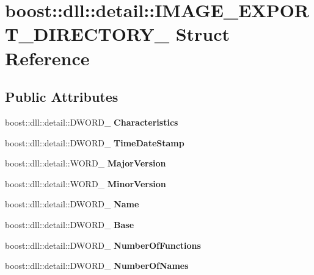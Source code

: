 \hypertarget{a01596}{}\section{boost\+:\+:dll\+:\+:detail\+:\+:I\+M\+A\+G\+E\+\_\+\+E\+X\+P\+O\+R\+T\+\_\+\+D\+I\+R\+E\+C\+T\+O\+R\+Y\+\_\+ Struct Reference}
\label{a01596}
\subsection*{Public Attributes}
\begin{DoxyCompactItemize}
\item 
\mbox{\label{a01596_a9e38ab93cca0b67f8e2442732422e6d2}} 
boost\+::dll\+::detail\+::\+D\+W\+O\+R\+D\+\_\+ {\bfseries Characteristics}
\item 
\mbox{\label{a01596_a739de9030de675c85bfeb2a5d3d5be67}} 
boost\+::dll\+::detail\+::\+D\+W\+O\+R\+D\+\_\+ {\bfseries Time\+Date\+Stamp}
\item 
\mbox{\label{a01596_a039cfd06d5bb240d9f61dc92eb41f53e}} 
boost\+::dll\+::detail\+::\+W\+O\+R\+D\+\_\+ {\bfseries Major\+Version}
\item 
\mbox{\label{a01596_a9bba569a6e4fc6ee2f92594cb8b6487f}} 
boost\+::dll\+::detail\+::\+W\+O\+R\+D\+\_\+ {\bfseries Minor\+Version}
\item 
\mbox{\label{a01596_ab8e041ceece18fa6e0589eb33d480629}} 
boost\+::dll\+::detail\+::\+D\+W\+O\+R\+D\+\_\+ {\bfseries Name}
\item 
\mbox{\label{a01596_aec005afc52afc2fab10a60f219a35afc}} 
boost\+::dll\+::detail\+::\+D\+W\+O\+R\+D\+\_\+ {\bfseries Base}
\item 
\mbox{\label{a01596_a7d1acd283af07c583f71f6a5405470fb}} 
boost\+::dll\+::detail\+::\+D\+W\+O\+R\+D\+\_\+ {\bfseries Number\+Of\+Functions}
\item 
\mbox{\label{a01596_a6fd30ba5be0d6349aa2398a6a4c57eb2}} 
boost\+::dll\+::detail\+::\+D\+W\+O\+R\+D\+\_\+ {\bfseries Number\+Of\+Names}

\end{DoxyCompactItemize}
